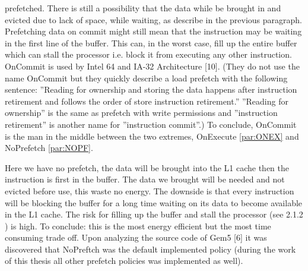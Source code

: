 prefetched. There is still a possibility that the data while be brought in and evicted
due to lack of space, while waiting, as describe in the previous paragraph. Prefetching
data on commit might still mean that the instruction may be waiting in the first line
of the buffer. This can, in the worst case, fill up the entire buffer which can stall the
processor i.e. block it from executing any other instruction. OnCommit is used by
Intel 64 and IA-32 Architecture [10]\fixme. (They do not use the name OnCommit but they
quickly describe a load prefetch with the following sentence: ”Reading for ownership
and storing the data happens after instruction retirement and follows the order of
store instruction retirement.” ”Reading for ownership” is the same as prefetch with
write permissions and ”instruction retirement” is another name for ”instruction commit”.)
To conclude, OnCommit is the man in the middle between the two extremes,
OnExecute \ref{par:ONEX} and NoPrefetch \ref{par:NOPF}.

 Here we have no prefetch, the data will be brought into the
L1 cache then the instruction is first in the buffer. The data we brought will be
needed and not evicted before use, this waste no energy. The downside is that every
instruction will be blocking the buffer for a long time waiting on its data to become
available in the L1 cache. The risk for filling up the buffer and stall the processor
(see 2.1.2 \fixme) is high. To conclude: this is the most energy efficient but the most time
consuming trade off. Upon analyzing the source code of Gem5 [6] \fixme it was discovered
that NoPreftch was the default implemented policy (during the work of this thesis all
other prefetch policies was implemented as well).


